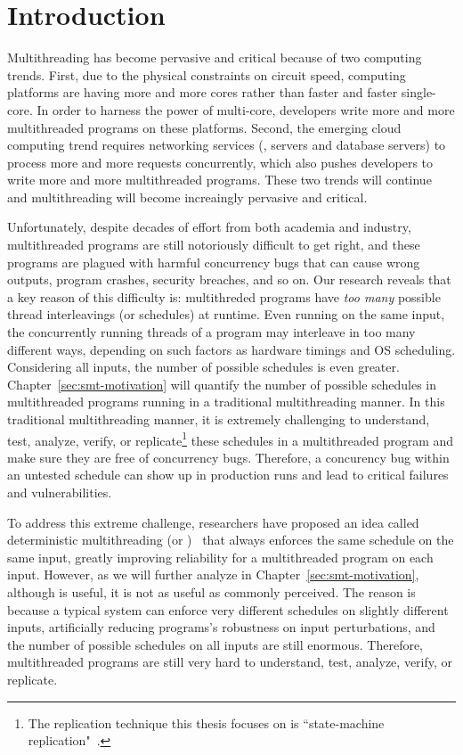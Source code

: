 \chapter{Introduction} \label{sec:intro}

Multithreading has become pervasive and critical because of two computing
trends. First, due to the physical constraints on circuit speed, computing
platforms are having more and more cores rather than faster and faster
single-core. In order to harness the power of multi-core, developers write more
and more multithreaded programs on these platforms. Second, the emerging cloud
computing trend requires networking services (\eg, \http servers and database
servers) to process more and more requests concurrently, which also pushes
developers to write more and more multithreaded programs. These two trends will
continue and multithreading will become increaingly pervasive and critical.

Unfortunately, despite decades of effort from both academia and industry,
multithreaded programs are still notoriously difficult to get right, and these
programs are plagued with harmful concurrency bugs that can cause wrong outputs,
program crashes, security breaches, and so on. Our research reveals that a key
reason of this difficulty is: multithreded programs have \emph{too many}
possible thread interleavings (or schedules) at runtime. Even running on the
same input, the concurrently running threads of a program may interleave in too
many different ways, depending on such factors as hardware timings and OS
scheduling. Considering all inputs, the number of possible schedules is even
greater. Chapter~\ref{sec:smt-motivation} will quantify the number of
possible schedules in multithreaded programs running in a traditional
multithreading manner. In this traditional multithreading manner, it is
extremely challenging to understand, test, analyze, verify, or
replicate\footnote{ The replication technique this thesis focuses on is
``state-machine replication"~\cite{paxos:practical}. } these schedules in a
multithreaded program and make sure they are free of concurrency bugs.
Therefore, a concurency bug within an untested schedule can show up in
production runs and lead to critical failures and vulnerabilities.

To address this extreme challenge, researchers have proposed an idea called
deterministic multithreading (or \dmt)~\cite{dthreads:sosp11, dpj:oopsla09,
dmp:asplos09, kendo:asplos09, coredet:asplos10} that always enforces the same
schedule on the same input, greatly improving reliability for a multithreaded
program on each input. However, as we will further analyze in
Chapter~\ref{sec:smt-motivation}, although \dmt is useful, it is not as useful
as commonly perceived. The reason is because a typical \dmt system can enforce
very different schedules on slightly different inputs, artificially reducing
programs's robustness on input perturbations, and the number of possible
schedules on all inputs are still enormous. Therefore, multithreaded programs
are still very hard to understand, test, analyze, verify, or replicate.

